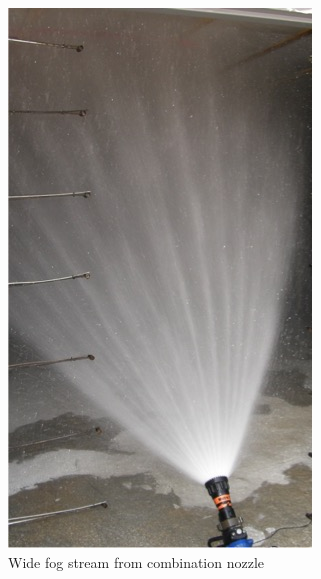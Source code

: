 \documentclass[12pt,oneside]{book}
\begin{document}
\begin{figure}[!ht]
\begin{subfigure}[b]{0.45\columnwidth}
		\includegraphics[width=0.75\columnwidth]{../Figures/Pictures/WF_example}
		\caption{Wide fog stream from combination nozzle}
	\end{subfigure}
	\\~\\
	\begin{subfigure}[b]{0.45\columnwidth}
		\centering

\end{subfigure}
\end{figure}
\end{document}
